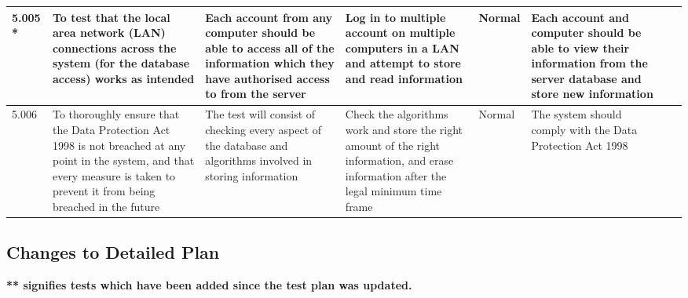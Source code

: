 \begin{landscape}
\begin{center}
\begin{longtable}{|p{1.5cm}|p{2.5cm}|p{2.5cm}|p{2cm}|p{2cm}|p{2cm}|p{2cm}|p{2cm}|}
5.005 * & To test that the local area network (LAN) connections across the system (for the database access) works as intended & Each account from any computer should be able to access all of the information which they have authorised access to from the server & Log in to multiple account on multiple computers in a LAN and attempt to store and read information & Normal & Each account and computer should be able to view their information from the server database and store new information & & \\ \hline
5.006 & To thoroughly ensure that the Data Protection Act 1998 is not breached at any point in the system, and that every measure is taken to prevent it from being breached in the future & The test will consist of checking every aspect of the database and algorithms involved in storing information & Check the algorithms work and store the right amount of the right information, and erase information after the legal minimum time frame & Normal & The system should comply with the Data Protection Act 1998 & & \\ \hline
    \end{longtable}
\end{center}














\subsection{Changes to Detailed Plan}











\textbf{** signifies tests which have been added since the test plan was updated.}




\end{landscape}
